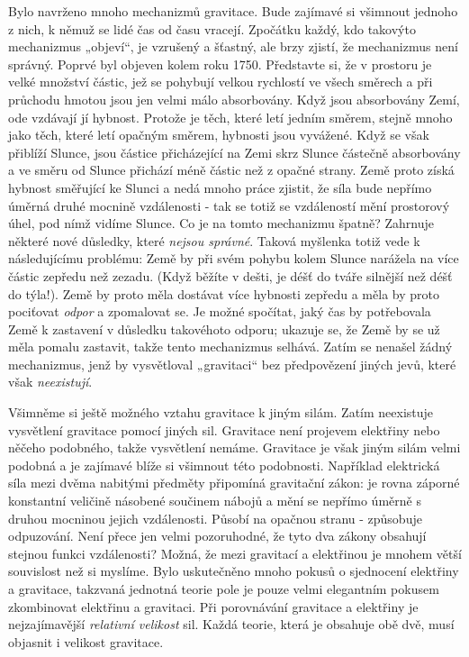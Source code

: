     Bylo navrženo mnoho mechanizmů gravitace. Bude zajímavé si všimnout jednoho z nich, k němuž se 
    lidé čas od času vracejí. Zpočátku každý, kdo takovýto mechanizmus „objeví“, je vzrušený a 
    šťastný, ale brzy zjistí, že mechanizmus není správný. Poprvé byl objeven kolem roku 
    \num{1750}. Představte si, že v prostoru je velké množství částic, jež se pohybují velkou 
    rychlostí ve všech směrech a při průchodu hmotou jsou jen velmi málo absorbovány. Když jsou 
    absorbovány Zemí, ode vzdávají jí hybnost. Protože je těch, které letí jedním směrem, stejně 
    mnoho jako těch, které letí opačným směrem, hybnosti jsou vyvážené. Když se však přiblíží 
    Slunce, jsou částice přicházející na Zemi skrz Slunce částečně absorbovány a ve směru od Slunce 
    přichází méně částic než z opačné strany. Země proto získá hybnost směřující ke Slunci a nedá 
    mnoho práce zjistit, že síla bude nepřímo úměrná druhé mocnině vzdálenosti - tak se totiž se 
    vzdáleností mění prostorový úhel, pod nímž vidíme Slunce. Co je na tomto mechanizmu špatně? 
    Zahrnuje některé nové důsledky, které \emph{nejsou správné}. Taková myšlenka totiž vede k 
    následujícímu problému: Země by při svém pohybu kolem Slunce narážela na více částic zepředu 
    než zezadu. (Když běžíte v dešti, je déšť do tváře silnější než déšť do týla!). Země by proto 
    měla dostávat více hybnosti zepředu a měla by proto pociťovat \emph{odpor} a zpomalovat se. Je 
    možné spočítat, jaký čas by potřebovala Země k zastavení v důsledku takovéhoto odporu; ukazuje 
    se, že Země by se už měla pomalu zastavit, takže tento mechanizmus selhává. Zatím se nenašel 
    žádný mechanizmus, jenž by vysvětloval „gravitaci“ bez předpovězení jiných jevů, které však 
    \emph{neexistují}.
    
    Všimněme si ještě možného vztahu gravitace k jiným silám. Zatím neexistuje vysvětlení gravitace 
    pomocí jiných sil. Gravitace není projevem elektřiny nebo něčeho podobného, takže vysvětlení 
    nemáme. Gravitace je však jiným silám velmi podobná a je zajímavé blíže si všimnout této 
    podobnosti. Například elektrická síla mezi dvěma nabitými předměty připomíná gravitační zákon: 
    je rovna záporné konstantní veličině násobené součinem nábojů a mění se nepřímo úměrně s druhou 
    mocninou jejich vzdálenosti. Působí na opačnou stranu - způsobuje odpuzování. Není přece jen 
    velmi pozoruhodné, že tyto dva zákony obsahují stejnou funkci vzdálenosti? Možná, že mezi 
    gravitací a elektřinou je mnohem větší souvislost než si myslíme. Bylo uskutečněno mnoho pokusů 
    o sjednocení elektřiny a gravitace, takzvaná jednotná teorie pole je pouze velmi elegantním 
    pokusem zkombinovat elektřinu a gravitaci. Při porovnávání gravitace a elektřiny je 
    nejzajímavější \emph{relativní velikost} sil. Každá teorie, která je obsahuje obě dvě, musí 
    objasnit i velikost gravitace.
    
